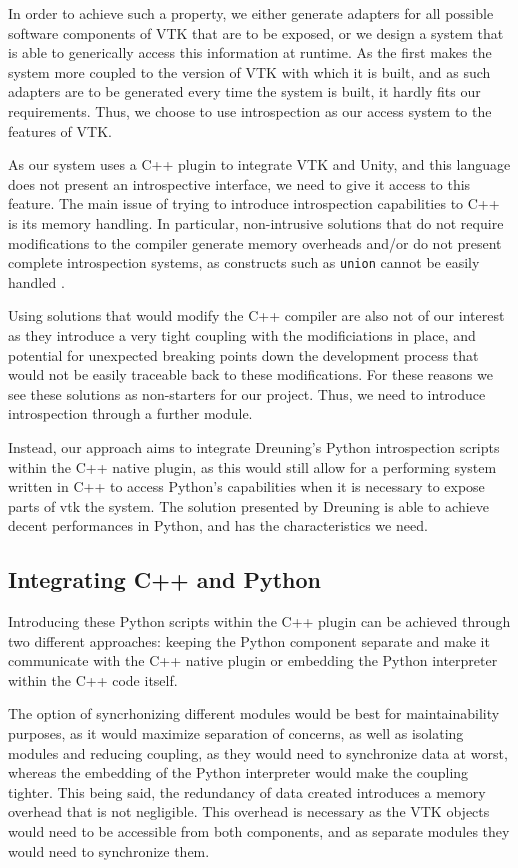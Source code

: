 In order to achieve such a property, we either generate adapters for all possible software components of VTK that are to be exposed, or we design a system that is able to generically access this information at runtime. As the first makes the system more coupled to the version of VTK with which it is built, and as such adapters are to be generated every time the system is built, it hardly fits our requirements. Thus, we choose to use introspection as our access system to the features of VTK.

As our system uses a C++ plugin to integrate VTK and Unity, and this language does not present an introspective interface, we need to give it access to this feature. The main issue of trying to introduce introspection capabilities to C++ is its memory handling. In particular, non-intrusive solutions that do not require modifications to the compiler generate memory overheads \cite{bayser2012rtti} and/or do not present complete introspection systems, as constructs such as \verb|union| cannot be easily handled \cite{tyng1998nonintrusive}.

Using solutions that would modify the C++ compiler are also not of our interest as they introduce a very tight coupling with the modificiations in place, and potential for unexpected breaking points down the development process that would not be easily traceable back to these modifications. For these reasons we see these solutions as non-starters for our project. Thus, we need to introduce introspection through a further module.

Instead, our approach aims to integrate Dreuning's Python introspection scripts \cite{dreuning_visual_2016} within the C++ native plugin, as this would still allow for a performing system written in C++ to access Python's capabilities when it is necessary to expose parts of \acrshort{vtk} the system. The solution presented by Dreuning is able to achieve decent performances in Python, and has the characteristics we need.

\subsection{Integrating C++ and Python}

Introducing these Python scripts within the C++ plugin can be achieved through two different approaches: keeping the Python component separate and make it communicate with the C++ native plugin or embedding the Python interpreter within the C++ code itself.

The option of syncrhonizing different modules would be best for maintainability purposes, as it would maximize separation of concerns, as well as isolating modules and reducing coupling, as they would need to synchronize data at worst, whereas the embedding of the Python interpreter would make the coupling tighter. This being said, the redundancy of data created introduces a memory overhead that is not negligible. This overhead is necessary as the VTK objects would need to be accessible from both components, and as separate modules they would need to synchronize them. 

